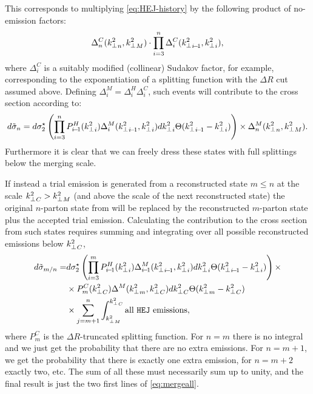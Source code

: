 This corresponds to multiplying \cref{eq:HEJ-history} by the following product of no-emission factors:
\begin{equation}
\label{eq:collinear_sudakovs}
\Delta^C_n({k^2_\perp}_{n},{k^2_\perp}_{M}) \cdot \prod_{i=3}^n \Delta^C_i({k^2_\perp}_{i\!-\!1},{k^2_\perp}_{i}),
\end{equation}
where $\Delta^C_i$ is a suitably modified (collinear) Sudakov
  factor, for example, corresponding to the exponentiation of a \pyt splitting
  function with the $\Delta R$ cut assumed above. 
Defining
$\Delta^M_i=\Delta^H_i\Delta^C_i$, such events will contribute to the cross section according to:
\begin{equation}
  \label{eq:mergems}
  d\tilde{\sigma}_n=
  d\sigma_2^{\star} \left(\prod_{i=3}^nP_{i\!-\!1}^H({k^2_\perp}_{i})\Delta^M_i({k^2_\perp}_{i\!-\!1},{k^2_\perp}_{i})
    d{k^2_\perp}_{i}\Theta({k^2_\perp}_{i\!-\!1}-{k^2_\perp}_{i})\right)\times\Delta^M_n({k^2_\perp}_{n},{k^2_\perp}_{M}).
\end{equation}
Furthermore it is clear that we can freely dress these states with full \pyt
splittings below the merging scale.

If instead a trial emission is generated from a reconstructed state
$m\le n$ at the scale ${k^2_\perp}_{C}>{k^2_\perp}_{M}$ (and above the scale of the
next reconstructed state) the original $n$-parton state from \HEJ will
be replaced by the reconstructed $m$-parton state plus the accepted
trial emission. Calculating the contribution to the cross section from
such states requires summing and integrating over all possible
reconstructed \HEJ emissions below ${k^2_\perp}_{C}$,
\begin{align}
  \label{eq:mergeall}
  d\tilde{\sigma}_{m/n}=&d\sigmab \left(\prod_{i=3}^mP^H_{i\!-\!1}(\kti{i})
    \Delta^M_{i\!-\!1}(\kti{i\!-\!1},\kti{i})d\kti{i}\Theta(\kti{i\!-\!1}-\kti{i})\right)
  \times\nonumber\\
  &\times P^C_m(\kti{C})\Delta^M(\kti{m},\kti{C})d\kti{C}\Theta(\kti{m}-\kti{C})\\
  &\times \sum_{j=m+1}^{n} \int_{\kti{M}}^{\kti{C}}\text{all \HEJ emissions}, \nonumber
\end{align}
where $P^C_m$ is the $\Delta R$-truncated \pyt splitting function. For
$n=m$ there is no integral and we just get the probability that there
are no extra emissions. For $n=m+1$, we get the probability that there
is exactly one extra emission, for $n=m+2$ exactly two, etc. The sum
of all these must necessarily sum up to unity, and the final result is
just the two first lines of \cref{eq:mergeall}.


